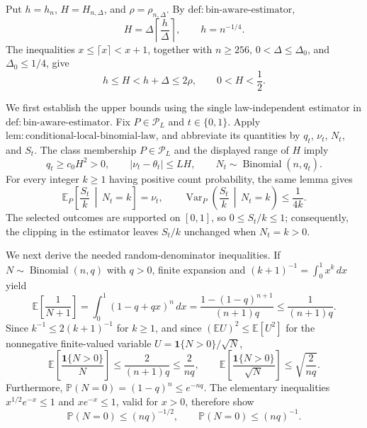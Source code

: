 Put \(h=h_n\), \(H=H_{n,\Delta}\), and \(\rho=\rho_{n,\Delta}\).  By \(\mathrm{def:bin\text{-}aware\text{-}estimator}\),
\[
 H=\Delta\left\lceil\frac{h}{\Delta}\right\rceil,
 \qquad h=n^{-1/4}.
\]
The inequalities \(x\leq\lceil x\rceil<x+1\), together with \(n\geq256\), \(0<\Delta\leq\Delta_0\), and \(\Delta_0\leq1/4\), give
\[
 h\leq H<h+\Delta\leq2\rho,
 \qquad 0<H<\frac12.
\]

We first establish the upper bounds using the single law-independent estimator in \(\mathrm{def:bin\text{-}aware\text{-}estimator}\).  Fix \(P\in\mathcal P_L\) and \(t\in\{0,1\}\).  Apply \(\mathrm{lem:conditional\text{-}local\text{-}binomial\text{-}law}\), and abbreviate its quantities by \(q_t\), \(\nu_t\), \(N_t\), and \(S_t\).  The class membership \(P\in\mathcal P_L\) and the displayed range of \(H\) imply
\[
 q_t\geq c_0H^2>0,
 \qquad |\nu_t-\theta_t|\leq LH,
 \qquad N_t\sim\operatorname{Binomial}(n,q_t).
\]
For every integer \(k\geq1\) having positive count probability, the same lemma gives
\[
 \mathbb E_P\!\left[\frac{S_t}{k}\,\middle|\,N_t=k\right]=\nu_t,
 \qquad
 \operatorname{Var}_P\!\left(\frac{S_t}{k}\,\middle|\,N_t=k\right)\leq\frac1{4k}.
\]
The selected outcomes are supported on \([0,1]\), so \(0\leq S_t/k\leq1\); consequently, the clipping in the estimator leaves \(S_t/k\) unchanged when \(N_t=k>0\).

We next derive the needed random-denominator inequalities.  If \(N\sim\operatorname{Binomial}(n,q)\) with \(q>0\), finite expansion and \((k+1)^{-1}=\int_0^1x^k\,dx\) yield
\[
 \mathbb E\!\left[\frac1{N+1}\right]
 =\int_0^1(1-q+qx)^n\,dx
 =\frac{1-(1-q)^{n+1}}{(n+1)q}
 \leq\frac1{(n+1)q}.
\]
Since \(k^{-1}\leq2(k+1)^{-1}\) for \(k\geq1\), and since \((\mathbb E U)^2\leq\mathbb E[U^2]\) for the nonnegative finite-valued variable \(U=\mathbf1\{N>0\}/\sqrt N\),
\[
 \mathbb E\!\left[\frac{\mathbf1\{N>0\}}N\right]
 \leq\frac2{(n+1)q}
 \leq\frac2{nq},
 \qquad
 \mathbb E\!\left[\frac{\mathbf1\{N>0\}}{\sqrt N}\right]
 \leq\sqrt{\frac2{nq}}.
\]
Furthermore, \(\mathbb P(N=0)=(1-q)^n\leq e^{-nq}\).  The elementary inequalities \(x^{1/2}e^{-x}\leq1\) and \(xe^{-x}\leq1\), valid for \(x>0\), therefore show
\[
 \mathbb P(N=0)\leq(nq)^{-1/2},
 \qquad
 \mathbb P(N=0)\leq(nq)^{-1}.
\]

